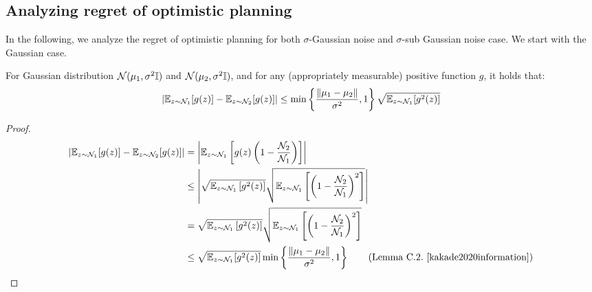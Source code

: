 \subsection{Analyzing regret of optimistic planning}
In the following, we analyze the regret of optimistic planning for both $\sigma$-Gaussian noise and $\sigma$-sub Gaussian noise case. We start with the Gaussian case.
\begin{lemma}
\label{lem:absolute_diff_gaussians}
For Gaussian distribution ${\mathcal{N}}(\mu_1, \sigma^2 \mathbb{I})$ and ${\mathcal{N}}(\mu_2, \sigma^2 \mathbb{I})$, and for any (appropriately measurable) positive function $g$, it holds that:
\begin{equation*}
    \left\lvert \mathbb{E}_{z \sim {\mathcal{N}}_1}[g(z)] - \mathbb{E}_{z \sim {\mathcal{N}}_2}[g(z)] \right\rvert \leq \min\left\{ \frac{\left\lVert\mu_1 - \mu_2\right\rVert}{\sigma^2}, 1 \right\} \sqrt{\mathbb{E}_{z \sim {\mathcal{N}}_1}[g^2(z)]}
\end{equation*}
\end{lemma}
\begin{proof}
    \begin{align*}
        \left\lvert \E_{z \sim \setN_1}[g(z)] - \E_{z \sim \setN_2}[g(z)] \right\rvert &= \left\lvert \E_{z \sim \setN_1} \left[ g(z) \left(1-\frac{\setN_{2}}{\setN_1}\right)\right]\right\rvert \\
        &\leq \left\lvert \sqrt{\E_{z \sim \setN_1} \left[ g^2(z)\right]} \sqrt{\E_{z \sim \setN_1}\left[\left(1-\frac{\setN_{2}}{\setN_1}\right)^2\right]}\right\rvert \\
        &= \sqrt{\E_{z \sim \setN_1} \left[ g^2(z)\right]} \sqrt{\E_{z \sim \setN_1}\left[\left(1-\frac{\setN_{2}}{\setN_1}\right)^2\right]} \\
        &\leq \sqrt{\E_{z \sim \setN_1}[g^2(z)]} \min\left\{ \frac{\norm{\mu_1 - \mu_2}}{\sigma^2}, 1 \right\} \tag{Lemma C.2.~\cite{kakade2020information}}
    \end{align*}
\end{proof}

